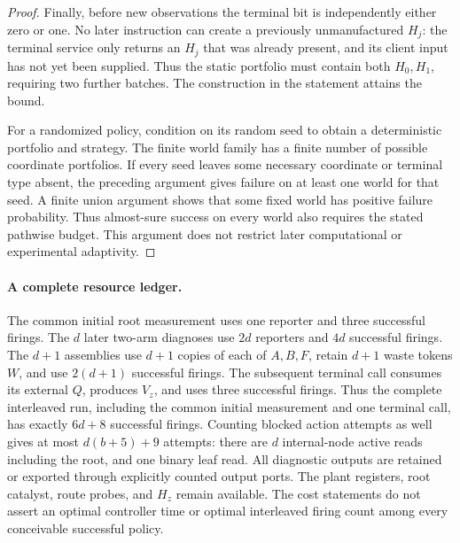 \documentclass[11pt]{article}
\theoremstyle{definition}
\theoremstyle{remark}
\begin{document}
\begin{proof}
Finally, before new observations the terminal bit is independently either
zero or one. No later instruction can create a previously unmanufactured
$H_j$: the terminal service only returns an $H_j$ that was already present,
and its client input has not yet been supplied. Thus the static portfolio
must contain both $H_0,H_1$, requiring two further batches. The construction
in the statement attains the bound.

For a randomized policy, condition on its random seed to obtain a
deterministic portfolio and strategy. The finite world family has a finite
number of possible coordinate portfolios. If every seed leaves some
necessary coordinate or terminal type absent, the preceding argument gives
failure on at least one world for that seed. A finite union argument shows
that some fixed world has positive failure probability. Thus almost-sure
success on every world also requires the stated pathwise budget. This
argument does not restrict later computational or experimental adaptivity.
\end{proof}

\paragraph{A complete resource ledger.}
The common initial root measurement uses one reporter and three successful
firings. The $d$ later two-arm diagnoses use $2d$ reporters and $4d$
successful firings. The $d+1$ assemblies use $d+1$ copies of each of
$A,B,F$, retain $d+1$ waste tokens $W$, and use $2(d+1)$ successful firings.
The subsequent terminal call consumes its external $Q$, produces $V_z$,
and uses three successful firings. Thus the complete interleaved run,
including the common initial measurement and one terminal call, has
exactly $6d+8$ successful firings. Counting blocked action attempts as
well gives at most $d(b+5)+9$ attempts: there are $d$ internal-node active
reads including the root, and one binary leaf read. All diagnostic outputs
are retained or exported through explicitly counted output ports. The
plant registers, root catalyst, route probes, and $H_z$ remain available.
The cost statements do not assert an optimal controller time or optimal
interleaved firing count among every conceivable successful policy.
\end{document}
